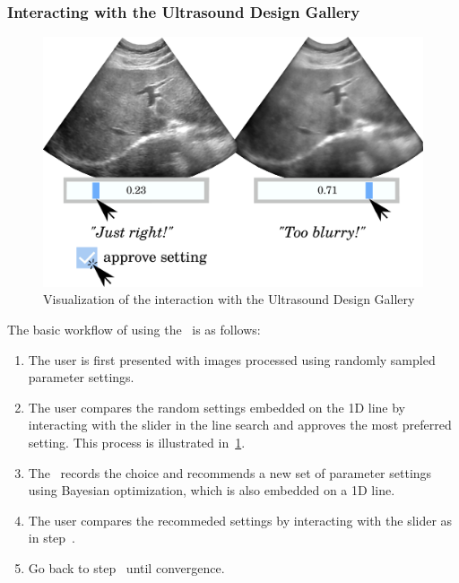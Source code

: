 \subsubsection{Interacting with the Ultrasound Design Gallery}
%
\begin{figure}[h]
  \centering
  \includegraphics[scale=0.3]{figures/ui_interaction.pdf}
  \caption{Visualization of the interaction with the Ultrasound Design Gallery}\label{fig:interaction}
\end{figure}
%
The basic workflow of using the \usdg~is as follows:
\begin{enumerate}
\item[\ding{182}] The user is first presented with images processed using randomly sampled parameter settings.
\item[\ding{183}] The user compares the random settings embedded on the 1D line by interacting with the slider in the line search and approves the most preferred setting. This process is illustrated in~\cref{fig:interaction}.
\item[\ding{184}] The \usdg~records the choice and recommends a new set of parameter settings using Bayesian optimization, which is also embedded on a 1D line.
\item[\ding{185}] The user compares the recommeded settings by interacting with the slider as in step~.
\item[\ding{186}] Go back to step~ until convergence.
\end{enumerate}

